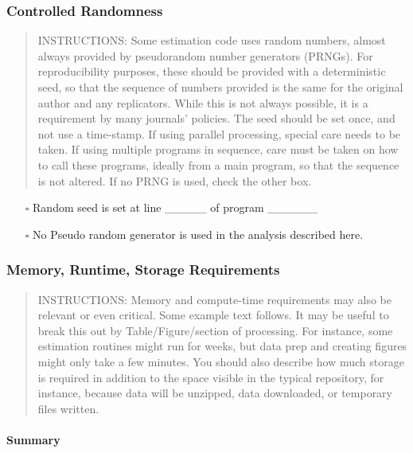 \documentclass[
]{article}
\providecommand{\tightlist}{%
  \setlength{\itemsep}{0pt}\setlength{\parskip}{0pt}}
\begin{document}
\hypertarget{controlled-randomness}{%
\subsubsection{Controlled Randomness}\label{controlled-randomness}}

\begin{quote}
INSTRUCTIONS: Some estimation code uses random numbers, almost always
provided by pseudorandom number generators (PRNGs). For reproducibility
purposes, these should be provided with a deterministic seed, so that
the sequence of numbers provided is the same for the original author and
any replicators. While this is not always possible, it is a requirement
by many journals' policies. The seed should be set once, and not use a
time-stamp. If using parallel processing, special care needs to be
taken. If using multiple programs in sequence, care must be taken on how
to call these programs, ideally from a main program, so that the
sequence is not altered. If no PRNG is used, check the other box.
\end{quote}

\begin{itemize}
\tightlist
\item[$\square$]
  Random seed is set at line \_\_\_\_\_ of program \_\_\_\_\_\_
\item[$\square$]
  No Pseudo random generator is used in the analysis described here.
\end{itemize}

\hypertarget{memory-runtime-storage-requirements}{%
\subsubsection{Memory, Runtime, Storage
Requirements}\label{memory-runtime-storage-requirements}}

\begin{quote}
INSTRUCTIONS: Memory and compute-time requirements may also be relevant
or even critical. Some example text follows. It may be useful to break
this out by Table/Figure/section of processing. For instance, some
estimation routines might run for weeks, but data prep and creating
figures might only take a few minutes. You should also describe how much
storage is required in addition to the space visible in the typical
repository, for instance, because data will be unzipped, data
downloaded, or temporary files written.
\end{quote}

\hypertarget{summary}{%
\paragraph{Summary}\label{summary}}
\end{document}
